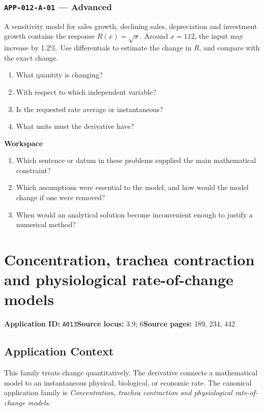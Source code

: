 \documentclass[11pt]{book}
\newcommand{\pid}[1]{\texttt{#1}}
\newcommand{\workspace}{\par\vspace{0.7in}\hrulefill\par\vspace{0.55in}\hrulefill\par}
\begin{document}
\subsection*{\pid{APP-012-A-01} — Advanced}
\begin{problembox}
A sensitivity model for sales growth, declining sales, depreciation and investment growth contains the response $R(x)=\sqrt{x}$. Around $x=112$, the input may increase by 1.2\%. Use differentials to estimate the change in $R$, and compare with the exact change.
\end{problembox}
\begin{promptbox}\begin{enumerate}
\item What quantity is changing?
\item With respect to which independent variable?
\item Is the requested rate average or instantaneous?
\item What units must the derivative have?
\end{enumerate}\end{promptbox}
\textbf{Workspace}\workspace
\begin{reflectionbox}\begin{enumerate}
\item Which sentence or datum in these problems supplied the main mathematical constraint?
\item Which assumptions were essential to the model, and how would the model change if one were removed?
\item When would an analytical solution become inconvenient enough to justify a numerical method?
\end{enumerate}\end{reflectionbox}
\chapter{Concentration, trachea contraction and physiological rate-of-change models}\label{app:A013}
\textbf{Application ID:} \pid{A013}\quad \textbf{Source locus:} 3.9; 6\quad \textbf{Source pages:} 189, 234, 442
\section*{Application Context}
This family treats change quantitatively. The derivative connects a mathematical model to an instantaneous physical, biological, or economic rate. The canonical application family is \emph{Concentration, trachea contraction and physiological rate-of-change models}.
\end{document}
